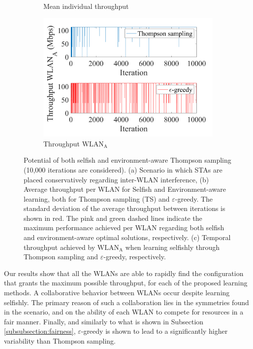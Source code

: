 \documentclass{article}
\begin{document}
\begin{figure}[h!]
\begin{subfigure}[b]{0.36\textwidth}
		\caption{Mean individual throughput}
		\label{fig:4_grid_selfish_benefits_mean_tpt}
	\end{subfigure}
	\begin{subfigure}[b]{0.36\textwidth}
		\includegraphics[width=\textwidth]{experiment_2_2_variability}
		\caption{Throughput $\text{WLAN}_\text{A}$}
		\label{fig:experiment_2_2_variability}
	\end{subfigure}
	\caption{Potential of both selfish and environment-aware Thompson sampling (10,000 iterations are considered). (a) Scenario in which STAs are placed conservatively regarding inter-WLAN interference, (b) Average throughput per WLAN for Selfish and Environment-aware learning, both for Thompson sampling (TS) and $\varepsilon$-greedy. The standard deviation of the average throughput between iterations is shown in red. The pink and green dashed lines indicate the maximum performance achieved per WLAN regarding both selfish and environment-aware optimal solutions, respectively. (c) Temporal throughput achieved by $\text{WLAN}_\text{A}$ when learning selfishly through Thompson sampling and $\varepsilon$-greedy, respectively.}
	\label{fig:4_grid_selfish_benefits}
\end{figure} 	

Our results show that all the WLANs are able to rapidly find the configuration that grants the maximum possible throughput, for each of the proposed learning methods. A collaborative behavior between WLANs occur despite learning selfishly. The primary reason of such a collaboration lies in the symmetries found in the scenario, and on the ability of each WLAN to compete for resources in a fair manner. Finally, and similarly to what is shown in Subsection \ref{subsubsection:fairness}, $\varepsilon$-greedy is shown to lead to a significantly higher variability than Thompson sampling.
\end{document}
